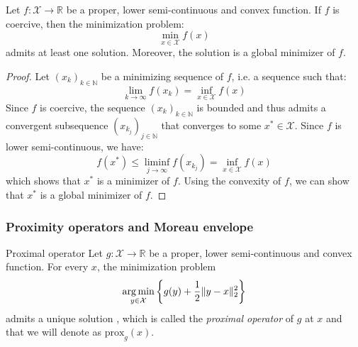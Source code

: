 \begin{proposition}
    Let $f: \mathcal{X} \to \mathbb{R}$ be a proper, lower semi-continuous and convex function. If $f$ is coercive, then the minimization problem:
    \begin{equation}
        \min_{x \in \mathcal{X}} f(x)
    \end{equation}
    admits at least one solution. Moreover, the solution is a global minimizer of $f$.
    \label{prop:coercive_function_minimization}
\end{proposition}
\begin{proof}
    Let $(x_k)_{k \in \mathbb{N}}$ be a minimizing sequence of $f$, i.e. a sequence such that:
    \begin{equation}
        \lim_{k \to \infty} f(x_k) = \inf_{x \in \mathcal{X}} f(x)
    \end{equation}
    Since $f$ is coercive, the sequence $(x_k)_{k \in \mathbb{N}}$ is bounded and thus admits a convergent subsequence $(x_{k_j})_{j \in \mathbb{N}}$ that converges to some $x^* \in \mathcal{X}$.
    Since $f$ is lower semi-continuous, we have:
    \begin{equation}
        f(x^*) \leq \liminf_{j \to \infty} f(x_{k_j}) = \inf_{x \in \mathcal{X}} f(x)
    \end{equation}
    which shows that $x^*$ is a minimizer of $f$. Using the convexity of $f$, we can show that $x^*$ is a global minimizer of $f$.
\end{proof}


\subsubsection{Proximity operators and Moreau envelope}

\begin{definition}{Proximal operator}
    Let $g: \mathcal{X} \to \mathbb{R}$ be a proper, lower semi-continuous and convex function.
    For every $x$, the minimization problem
    \begin{equation}
        \mathop{\mathrm{arg\,min}}_{y \in \mathcal{X}} \left\{ g(y) + \frac{1}{2} \|y - x\|_2^2 \right\}
    \end{equation}
    admits a unique solution \cite{Moreau1962}, which is called the \textit{proximal operator} of $g$ at $x$ and that we will denote as $\text{prox}_g(x)$.
    \label{def:proximal_operator_quad}
\end{definition}

